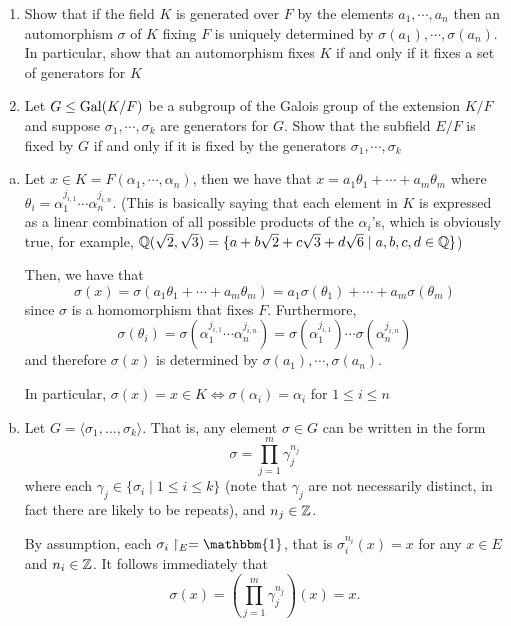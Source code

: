 
\begin{exercise}
    \begin{enumerate}
        \item Show that if the field $K$ is generated over $F$ by the elements $a_1, \cdots, a_n$ then an automorphism $\sigma$ of $K$ fixing $F$ is uniquely determined by $\sigma(a_1), \cdots, \sigma(a_n)$. In particular, show that an automorphism fixes $K$ if and only if it fixes a set of generators for $K$
        
        \item Let $G \leq \operatorname{Gal}(K/F)$ be a subgroup of the Galois group of the extension $K/F$ and suppose  $\sigma_1, \cdots, \sigma_k$ are generators for $G$. Show that the subfield $E/F$ is fixed by $G$ if and only if it is fixed by the generators  $\sigma_1, \cdots, \sigma_k$
    \end{enumerate}
\end{exercise}
\begin{solution}
    \begin{enumerate}[(a)]
        \item Let $x \in K = F(\alpha_1, \cdots, \alpha_n)$, then we have that $x = a_1\theta_1 + \cdots + a_m\theta_m$ where $\theta_i = \alpha_1^{j_{i,1}}\cdots \alpha_n^{j_{i,n}}$. (This is basically saying that each element in $K$ is expressed as a linear combination of all possible products of the $\alpha_i$'s, which is obviously true, for example, $\mathbb{Q}(\sqrt{2}, \sqrt{3}) = \{a + b\sqrt{2} + c\sqrt{3} + d\sqrt{6}\mid a,b,c,d\in \mathbb{Q}\}$)

        Then, we have that 
        \[\sigma(x) = \sigma(a_1\theta_1 + \cdots + a_m\theta_m) = a_1\sigma(\theta_1) + \cdots + a_m\sigma(\theta_m)\]
        since $\sigma$ is a homomorphism that fixes $F$. Furthermore,
        \[\sigma(\theta_i) = \sigma(\alpha_1^{j_{i,1}}\cdots \alpha_n^{j_{i,n}}) = \sigma(\alpha_1^{j_{i,1}})\cdots \sigma(\alpha_n^{j_{i,n}})\]
        and therefore $\sigma(x)$ is determined by $\sigma(a_1), \cdots, \sigma(a_n)$.

        In particular, $\sigma(x) = x \in K \iff \sigma(\alpha_i) = \alpha_i$ for $1 \leq i \leq n$

        \item Let $G=\langle \sigma_{1},\dots,\sigma_{k}\rangle$. That is, any element $\sigma\in G$ can be written in the form
        $$
        \sigma=\prod_{j=1}^{m}\gamma_{j}^{n_{j}}
        $$
        where each $\gamma_{j}\in\{\sigma_{i}\mid 1\leq i\leq k\}$ (note that $\gamma_{j}$ are not necessarily distinct, in fact there are likely to be repeats), and $n_{j}\in\mathbb{Z}$.

        By assumption, each $\sigma_{i}\restriction_{E}=\mathbbm{1}$, that is $\sigma_{i}^{n_{i}}(x)=x$ for any $x\in E$ and $n_{i}\in\mathbb{Z}$. It follows immediately that
        $$
        \sigma(x)=(\prod_{j=1}^{m}\gamma_{j}^{n_{j}})(x)=x.
        $$
    \end{enumerate}
\end{solution}

